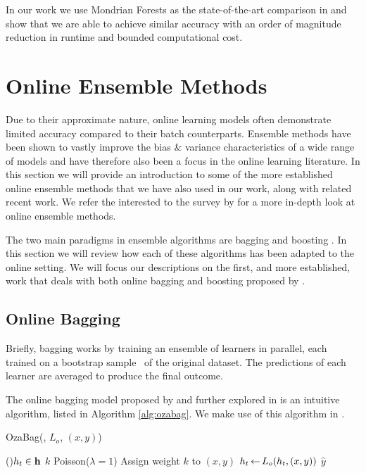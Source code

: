 In our work we use Mondrian Forests as the state-of-the-art comparison in \uncertaintrees
and show that we are able to achieve similar accuracy with an order of magnitude reduction
in runtime and bounded computational cost.


\section{Online Ensemble Methods}
\label{sec:bg-ol-ensembles}

Due to their approximate nature, online learning models often demonstrate
limited accuracy compared to their batch counterparts. Ensemble methods
have been shown to vastly improve the bias \& variance characteristics
of a wide range of models \cite{ensemble-methods-dietrich} and have therefore
also been a focus in the online learning literature.
In this section we will provide an introduction to some of the more established
online ensemble methods that we have also used in our work, along with related
recent work. We refer the interested to the survey by \citet{online-ensembles-survey}
for a more in-depth look at online ensemble methods.

The two main paradigms in ensemble algorithms are bagging \cite{bagging} and boosting \cite{boosting-freund, boosting-schapire}. In this section we will review how each of these algorithms
has been adapted to the online setting. We will focus our descriptions on the first, and more established,
work that deals with both online bagging and boosting proposed by \citet{Oza2001online}.

\subsection{Online Bagging}

Briefly, bagging works by training an ensemble of learners in parallel,
each trained on a bootstrap sample~\cite{bootstrap} of the original dataset.
The predictions of each learner are averaged to produce the final outcome.

The online bagging model proposed by \citet{Oza2001online} and further explored in
\cite{online-bagging-experiments} is an intuitive algorithm, listed in Algorithm
\ref{alg:ozabag}. We make use of this algorithm in \uncertaintrees.

\begin{algorithm}
	\small
	\caption{OzaBag(\ensemble, $L_o$, $(x,y)$)}
	\label{alg:ozabag}

	\ForEach(){$h_t \in \mathbf{h}$}{
		$k$  Poisson($\lambda = 1$) \;
		Assign weight $k$ to $(x,y)$ \;
		$h_t {\,\leftarrow\,} L_o(h_t, (x,y))$
	}
	\Return $\widehat{y}$ \;
\end{algorithm}

